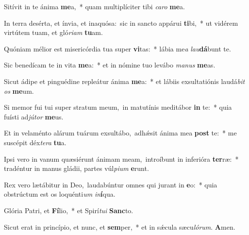 Sitívit in te ánima \textbf{me}a,~* quam multiplíciter tibi \textit{ca}\textit{ro} \textbf{me}a.

In terra desérta, et ínvia, et inaquósa:~\reddagger sic in sancto appárui \textbf{ti}bi,~* ut vidérem virtútem tuam, et gló\textit{ri}\textit{am} \textbf{tu}am.

Quóniam mélior est misericórdia tua super \textbf{vi}tas:~* lábia me\textit{a} \textit{lau}\textbf{dá}bunt te.

Sic benedícam te in vita \textbf{me}a:~* et in nómine tuo levábo \textit{ma}\textit{nus} \textbf{me}as.

Sicut ádipe et pinguédine repleátur ánima \textbf{me}a:~* et lábiis exsultatiónis laudá\textit{bit} \textit{os} \textbf{me}um.

Si memor fui tui super stratum meum,~\reddagger in matutínis meditábor \textbf{in} te:~* quia fuísti ad\textit{jú}\textit{tor} \textbf{me}us.

Et in velaménto alárum tuárum exsultábo,~\reddagger adhǽsit ánima mea \textbf{post} te:~* me suscépit déx\textit{te}\textit{ra} \textbf{tu}a.

Ipsi vero in vanum quæsiérunt ánimam meam,~\reddagger introíbunt in inferióra \textbf{ter}ræ:~* tradéntur in manus gládii, partes vúl\textit{pi}\textit{um} \textbf{e}runt.

Rex vero lætábitur in Deo,~\reddagger laudabúntur omnes qui jurant in \textbf{e}o:~* quia obstrúctum est os loquénti\textit{um} \textit{in}\textbf{í}qua.

Glória Patri, et \textbf{Fí}lio,~* et Spirí\textit{tu}\textit{i} \textbf{Sanc}to.

Sicut erat in princípio, et nunc, et \textbf{sem}per,~* et in sǽcula sæcu\textit{ló}\textit{rum}. \textbf{A}men.

